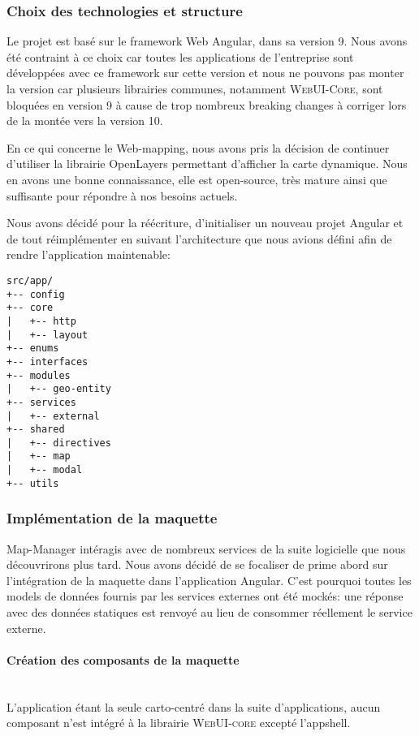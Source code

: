 \documentclass{rapportUHA40}
\begin{document}
\subsubsection{Choix des technologies et structure}
Le projet est basé sur le framework Web Angular, dans sa version 9. Nous avons
été contraint à ce choix car toutes les applications de l'entreprise sont
développées avec ce framework sur cette version et nous ne pouvons pas monter
la version car plusieurs librairies communes, notamment \textsc{WebUI-Core},
sont bloquées en version 9 à cause de trop nombreux breaking changes à corriger
lors de la montée vers la version 10.

En ce qui concerne le Web-mapping, nous avons pris la décision de continuer
d'utiliser la librairie OpenLayers permettant d'afficher la carte dynamique.
Nous en avons une bonne connaissance, elle est open-source, très mature ainsi
que suffisante pour répondre à nos besoins actuels.

Nous avons décidé pour la réécriture, d'initialiser un nouveau projet Angular
et de tout réimplémenter en suivant l'architecture que nous avions défini afin
de rendre l'application maintenable:
\begin{verbatim}
src/app/
+-- config
+-- core
|   +-- http
|   +-- layout
+-- enums
+-- interfaces
+-- modules
|   +-- geo-entity
+-- services
|   +-- external
+-- shared
|   +-- directives
|   +-- map
|   +-- modal
+-- utils
\end{verbatim}

\subsubsection{Implémentation de la maquette}
Map-Manager intéragis avec de nombreux services de la suite logicielle que nous
découvrirons plus tard. Nous avons décidé de se focaliser de prime abord sur
l'intégration de la maquette dans l'application Angular. C'est pourquoi toutes
les models de données fournis par les services externes ont été mockés: une
réponse  \fg{} avec des données statiques est renvoyé au lieu de
consommer réellement le service externe.

\paragraph{Création des composants de la maquette}\mbox{}\\
L'application étant la seule carto-centré dans la suite d'applications, aucun
composant n'est intégré à la librairie \textsc{WebUI-core} excepté
l'\gls{appshell}.
\end{document}
